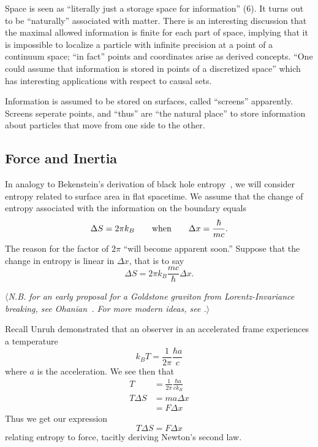 \documentclass{article}
\let\entropy=S
\begin{document}
Space is seen as ``literally just a storage space for
information'' (6). It turns out to be ``naturally'' associated
with matter. There is an interesting discussion that the maximal
allowed information is finite for each part of space, implying
that it is impossible to localize a particle with infinite
precision at a point of a continuum space; ``in fact'' points and
coordinates arise as derived concepts. ``One could assume that
information is stored in points of a discretized space'' which
has interesting applications with respect to causal sets.

Information is assumed to be stored on surfaces, called
``screens'' apparently. Screens seperate points, and ``thus'' are
``the natural place'' to store information about particles that
move from one side to the other.

\subsection{Force and Inertia}

In analogy to Bekenstein's derivation of black hole
entropy~\cite{Bekenstein:1973ur}, we will consider entropy
related to surface area in flat spacetime. We assume that the
change of entropy associated with the information on the boundary
equals
\begin{equation}
\Delta\entropy=2\pi k_{B}\qquad\hbox{when}\qquad\Delta x=\frac{\hbar}{mc}.
\end{equation}
The reason for the factor of $2\pi$ ``will become apparent
soon.'' Suppose that the change in entropy is linear in $\Delta
x$, that is to say
\begin{equation}
\Delta\entropy=2\pi k_{B}\frac{mc}{\hbar}\Delta x.
\end{equation}

\noindent$\langle$\emph{N.B. for an early proposal for a Goldstone graviton from
Lorentz-Invariance breaking, see
Ohanian~\cite{PhysRev.184.1305}. For more modern ideas, see \cite{Jenkins:2003hw}.}$\rangle$

Recall Unruh demonstrated that an observer in an accelerated
frame experiences a temperature
\begin{equation}
k_{B}T=\frac{1}{2\pi}\frac{\hbar a}{c}
\end{equation}
where $a$ is the acceleration. We see then that
\begin{subequations}
\begin{align}
T &= \frac{1}{2\pi}\frac{\hbar a}{ck_{B}}\\
T\Delta\entropy &= ma\Delta x\\
&=F\Delta x
\end{align}
\end{subequations}
Thus we get our expression
\begin{equation}
T\Delta\entropy = F\Delta x
\end{equation}
relating entropy to force, tacitly deriving Newton's second law.

\nocite{*}


\end{document}
